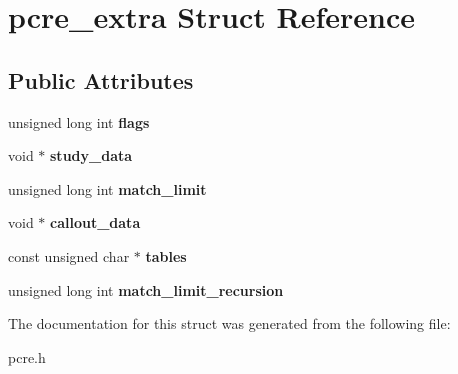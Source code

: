 \hypertarget{structpcre__extra}{\section{pcre\-\_\-extra \-Struct \-Reference}
\label{structpcre__extra}
}
\subsection*{\-Public \-Attributes}
\begin{DoxyCompactItemize}
\item 
\hypertarget{structpcre__extra_a2a7957f7f9d15b3b69f8652b2f50ecb3}{unsigned long int {\bfseries flags}}\label{structpcre__extra_a2a7957f7f9d15b3b69f8652b2f50ecb3}

\item 
\hypertarget{structpcre__extra_a27f29bdf9c4526d5bb3fb8ee514ee8e8}{void $\ast$ {\bfseries study\-\_\-data}}\label{structpcre__extra_a27f29bdf9c4526d5bb3fb8ee514ee8e8}

\item 
\hypertarget{structpcre__extra_aa1a16c13f086255baba34f5e8a180186}{unsigned long int {\bfseries match\-\_\-limit}}\label{structpcre__extra_aa1a16c13f086255baba34f5e8a180186}

\item 
\hypertarget{structpcre__extra_aef88fa059796850ca7f00842f5d88e8c}{void $\ast$ {\bfseries callout\-\_\-data}}\label{structpcre__extra_aef88fa059796850ca7f00842f5d88e8c}

\item 
\hypertarget{structpcre__extra_ae79d65e283cef92ecb9afe6961c46a4e}{const unsigned char $\ast$ {\bfseries tables}}\label{structpcre__extra_ae79d65e283cef92ecb9afe6961c46a4e}

\item 
\hypertarget{structpcre__extra_ac62a2bd02946b6b1e59615f15c903b37}{unsigned long int {\bfseries match\-\_\-limit\-\_\-recursion}}\label{structpcre__extra_ac62a2bd02946b6b1e59615f15c903b37}

\end{DoxyCompactItemize}


\-The documentation for this struct was generated from the following file\-:\begin{DoxyCompactItemize}
\item 
pcre.\-h\end{DoxyCompactItemize}
